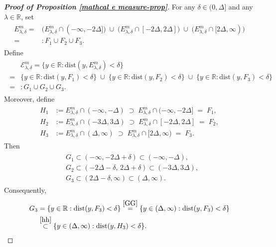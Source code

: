 \documentclass[10pt,a4paper]{amsart}
\begin{document}
{\begin{proof}[\bf Proof of Proposition \ref{mathcal e measure-prop}]
For any $\delta\in(0,\Delta]$ and any $\lambda\in\mathbb{R}$, set
\begin{align}\label{FF}
\begin{split}
  E^{m}_{\lambda,\delta}
  = &\bigl(E^{m}_{\lambda,\delta}\cap(-\infty,-2\Delta]\bigr)
     \;\cup\; \bigl(E^{m}_{\lambda,\delta}\cap[-2\Delta,2\Delta]\bigr)
     \;\cup\; \bigl(E^{m}_{\lambda,\delta}\cap[2\Delta,\infty)\bigr) \\
   =&:F_1 \cup F_2 \cup F_3 .
\end{split}
\end{align}
Define
\begin{align}\label{G}
\begin{split}
 & \mathcal{E}^{m}_{\lambda,\delta}
  = \{y\in\mathbb{R}:\mathrm{dist}(y,E^{m}_{\lambda,\delta})<\delta\} \\
  = &\{y\in\mathbb{R}:\mathrm{dist}(y,F_1)<\delta\}
     \;\cup\; \{y\in\mathbb{R}:\mathrm{dist}(y,F_2)<\delta\}
     \;\cup\; \{y\in\mathbb{R}:\mathrm{dist}(y,F_3)<\delta\} \\
 =&: G_1 \cup G_2 \cup G_3 .
\end{split}
\end{align}
Moreover, define
\begin{align}\label{hh}
\begin{split}
  H_1 &:= E^{m}_{\lambda,\delta}\cap(-\infty,-\Delta)
         \;\supset\; E^{m}_{\lambda,\delta}\cap(-\infty,-2\Delta] \;=\; F_1, \\
  H_2 &:= E^{m}_{\lambda,\delta}\cap(-3\Delta,3\Delta)
         \;\supset\; E^{m}_{\lambda,\delta}\cap[-2\Delta,2\Delta] \;=\; F_2, \\
  H_3 &:= E^{m}_{\lambda,\delta}\cap(\Delta,\infty)
         \;\supset\; E^{m}_{\lambda,\delta}\cap[2\Delta,\infty) \;=\; F_3 .
\end{split}
\end{align}
Then
\begin{align}\label{GG}
\begin{split}
  &G_1 \subset (-\infty,-2\Delta+\delta) \subset (-\infty,-\Delta),\\
  &G_2 \subset (-2\Delta-\delta,\,2\Delta+\delta) \subset (-3\Delta,3\Delta),\\
  &G_3 \subset (2\Delta-\delta,\infty) \subset (\Delta,\infty).
\end{split}
\end{align}
Consequently,
\begin{align}\label{gs}
\begin{split}
  G_3
  &= \{y\in\mathbb{R}:\mathrm{dist}(y,F_3)<\delta\} \overset{\eqref{GG}}{=} \{y\in(\Delta,\infty):\mathrm{dist}(y,F_3)<\delta\} \\
  &\overset{\eqref{hh}}{\subset} \{y\in(\Delta,\infty):\mathrm{dist}(y,H_3)<\delta\}.
\end{split}
\end{align}


\end{proof}}
\end{document}
